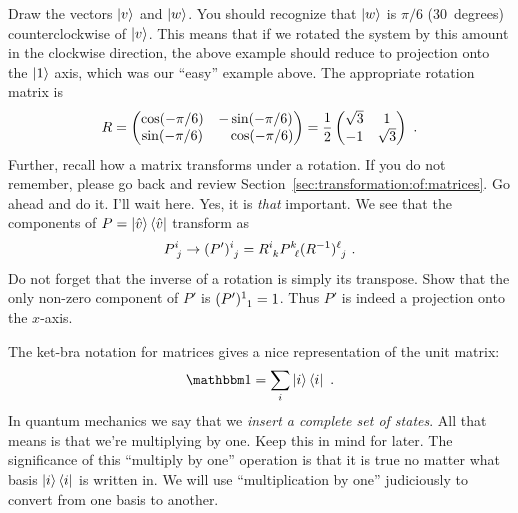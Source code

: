 \documentclass[12pt]{article}
\begin{document}
\begin{exercise}
Draw the vectors $\left|v\right\rangle$ and $\left|w\right\rangle$. You should recognize that $\left|w\right\rangle$ is $\pi/6$ (30~degrees) counterclockwise of $\left|v\right\rangle$. This means that if we rotated the system by this amount in the clockwise direction, the above example should reduce to projection onto the $\left|1\right\rangle$ axis, which was our ``easy'' example above. The appropriate rotation matrix is
\begin{align}
    R = 
    \begin{pmatrix}
        \cos(-\pi/6) & -\sin(-\pi/6)
        \\
        \sin(-\pi/6) & \pp\cos(-\pi/6)
    \end{pmatrix}
    = 
    \frac{1}{2}
    \begin{pmatrix}
        \sqrt{3} & 1 \\
        -1 & \sqrt{3}
    \end{pmatrix} \ .
\end{align}
Further, recall how a matrix transforms under a rotation. If you do not remember, please go back and review Section~\ref{sec:transformation:of:matrices}. Go ahead and do it. I'll wait here. Yes, it is \emph{that} important. We see that the components of $P = \left|\hat{v}\right\rangle \left\langle\hat{v}\right|$ transform as
\begin{align}
    P\aij{i}{j}\to (P')\aij{i}{j} = R\aij{i}{k} P\aij{k}{\ell} (R^{-1})\aij{\ell}{j}\ .
\end{align}
Do not forget that the inverse of a rotation is simply its transpose. Show that the only non-zero component of $P'$ is $(P')\aij{1}{1} = 1$. Thus $P'$ is indeed a projection onto the $x$-axis.
\end{exercise}

\begin{bigidea}\label{bigidea:multiply:by:one}
The ket-bra notation for matrices gives a nice representation of the unit matrix:
\begin{align}
    \one = \sum_i \ket{i}\bra{i}  \ .
\end{align}
In quantum mechanics we say that we \emph{insert a complete set of states}. All that means is that we're multiplying by one. Keep this in mind for later. The significance of this ``multiply by one'' operation is that it is true no matter what basis $\left|i\right\rangle\left\langle i\right|$ is written in. We will use ``multiplication by one'' judiciously to convert from one basis to another. 
\end{bigidea}
\end{document}
